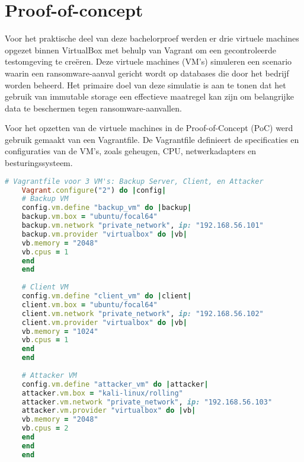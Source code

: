 \chapter{Proof-of-concept}%
\label{ch:poc}
Voor het praktische deel van deze bachelorproef werden er drie virtuele machines opgezet binnen VirtualBox met behulp van Vagrant om een gecontroleerde testomgeving te creëren. Deze virtuele machines (VM’s) simuleren een scenario waarin een ransomware-aanval gericht wordt op databases die door het bedrijf worden beheerd. Het primaire doel van deze simulatie is aan te tonen dat het gebruik van immutable storage een effectieve maatregel kan zijn om belangrijke data te beschermen tegen ransomware-aanvallen.

Voor het opzetten van de virtuele machines in de Proof-of-Concept (PoC) werd gebruik gemaakt van een Vagrantfile. De Vagrantfile definieert de specificaties en configuraties van de VM’s, zoals geheugen, CPU, netwerkadapters en besturingssysteem. 
\begin{lstlisting}[language=Ruby, caption={Vagrantfile voor drie VM's: Backup Server, Client, en Attacker}]
    # Vagrantfile voor 3 VM's: Backup Server, Client, en Attacker
    Vagrant.configure("2") do |config|
    # Backup VM
    config.vm.define "backup_vm" do |backup|
    backup.vm.box = "ubuntu/focal64"
    backup.vm.network "private_network", ip: "192.168.56.101"
    backup.vm.provider "virtualbox" do |vb|
    vb.memory = "2048"
    vb.cpus = 1
    end
    end
    
    # Client VM
    config.vm.define "client_vm" do |client|
    client.vm.box = "ubuntu/focal64"
    client.vm.network "private_network", ip: "192.168.56.102"
    client.vm.provider "virtualbox" do |vb|
    vb.memory = "1024"
    vb.cpus = 1
    end
    end
    
    # Attacker VM
    config.vm.define "attacker_vm" do |attacker|
    attacker.vm.box = "kali-linux/rolling"
    attacker.vm.network "private_network", ip: "192.168.56.103"
    attacker.vm.provider "virtualbox" do |vb|
    vb.memory = "2048"
    vb.cpus = 2
    end
    end
    end
\end{lstlisting}